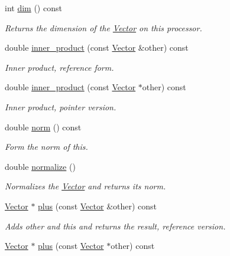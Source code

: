 \begin{DoxyCompactItemize}
int \hyperlink{class_c_a_r_o_m_1_1_vector_a8f8e5d44c3f2cd12e2f4090ddf97c735}{dim} () const 
\begin{DoxyCompactList}\small\item\em Returns the dimension of the \hyperlink{class_c_a_r_o_m_1_1_vector}{Vector} on this processor. \end{DoxyCompactList}\item 
double \hyperlink{class_c_a_r_o_m_1_1_vector_ad78f78bb34948e935c6d7aad47ca9902}{inner\-\_\-product} (const \hyperlink{class_c_a_r_o_m_1_1_vector}{Vector} \&other) const 
\begin{DoxyCompactList}\small\item\em Inner product, reference form. \end{DoxyCompactList}\item 
double \hyperlink{class_c_a_r_o_m_1_1_vector_aaf42efa8ebaad147be85baf2ed013a13}{inner\-\_\-product} (const \hyperlink{class_c_a_r_o_m_1_1_vector}{Vector} $\ast$other) const 
\begin{DoxyCompactList}\small\item\em Inner product, pointer version. \end{DoxyCompactList}\item 
double \hyperlink{class_c_a_r_o_m_1_1_vector_af699f7fcf238cf7fe47031ce21b45f5a}{norm} () const 
\begin{DoxyCompactList}\small\item\em Form the norm of this. \end{DoxyCompactList}\item 
double \hyperlink{class_c_a_r_o_m_1_1_vector_a82c59b2b1135267440cc127e0f782b4b}{normalize} ()
\begin{DoxyCompactList}\small\item\em Normalizes the \hyperlink{class_c_a_r_o_m_1_1_vector}{Vector} and returns its norm. \end{DoxyCompactList}\item 
\hyperlink{class_c_a_r_o_m_1_1_vector}{Vector} $\ast$ \hyperlink{class_c_a_r_o_m_1_1_vector_a2004f874de68848d1a0720afdfccd4b2}{plus} (const \hyperlink{class_c_a_r_o_m_1_1_vector}{Vector} \&other) const 
\begin{DoxyCompactList}\small\item\em Adds other and this and returns the result, reference version. \end{DoxyCompactList}\item 
\hyperlink{class_c_a_r_o_m_1_1_vector}{Vector} $\ast$ \hyperlink{class_c_a_r_o_m_1_1_vector_aa7dd759525e6fecb0f531dcb8b1b41a1}{plus} (const \hyperlink{class_c_a_r_o_m_1_1_vector}{Vector} $\ast$other) const 

\end{DoxyCompactItemize}
